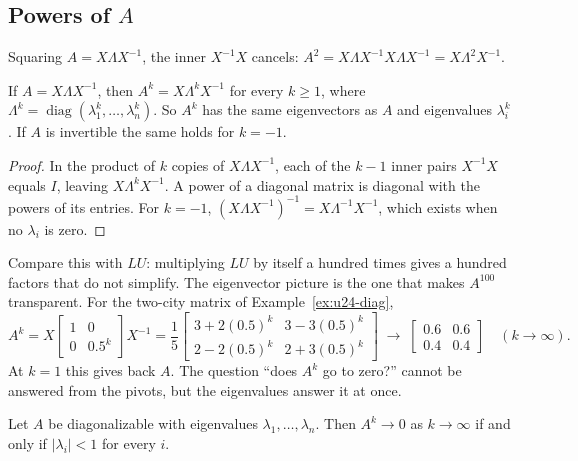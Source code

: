 \subsection{Powers of \texorpdfstring{\(A\)}{A}}

Squaring $A=X\Lambda X^{-1}$, the inner $X^{-1}X$ cancels:
$A^{2}=X\Lambda X^{-1}X\Lambda X^{-1}=X\Lambda^{2}X^{-1}$.

\begin{proposition}[Powers]\label{prop:u24-powers}
If $A=X\Lambda X^{-1}$, then $A^{k}=X\Lambda^{k}X^{-1}$ for every $k\ge1$, where
$\Lambda^{k}=\operatorname{diag}(\lambda_1^{k},\dots,\lambda_n^{k})$. So $A^{k}$ has the same
eigenvectors as $A$ and eigenvalues $\lambda_i^{k}$. If $A$ is invertible the same holds for
$k=-1$.
\end{proposition}

\begin{proof}
In the product of $k$ copies of $X\Lambda X^{-1}$, each of the $k-1$ inner pairs
$X^{-1}X$ equals $I$, leaving $X\Lambda^{k}X^{-1}$. A power of a diagonal matrix is
diagonal with the powers of its entries. For $k=-1$, $(X\Lambda X^{-1})^{-1}=X\Lambda^{-1}X^{-1}$,
which exists when no $\lambda_i$ is zero.
\end{proof}

Compare this with $LU$: multiplying $LU$ by itself a hundred times gives a hundred factors
that do not simplify. The eigenvector picture is the one that makes $A^{100}$ transparent.
For the two-city matrix of Example~\ref{ex:u24-diag},
\[
  A^{k}=X\begin{bmatrix} 1&0\\ 0&0.5^{k}\end{bmatrix}X^{-1}
  =\frac15\begin{bmatrix} 3+2(0.5)^{k} & 3-3(0.5)^{k}\\ 2-2(0.5)^{k} & 2+3(0.5)^{k}\end{bmatrix}
  \;\longrightarrow\;\begin{bmatrix} 0.6&0.6\\ 0.4&0.4\end{bmatrix}\quad(k\to\infty).
\]
At $k=1$ this gives back $A$. The question ``does $A^{k}$ go to zero?'' cannot be answered
from the pivots, but the eigenvalues answer it at once.

\begin{theorem}\label{thm:u24-stable}
Let $A$ be diagonalizable with eigenvalues $\lambda_1,\dots,\lambda_n$. Then $A^{k}\to0$ as
$k\to\infty$ if and only if $|\lambda_i|<1$ for every $i$.
\end{theorem}


